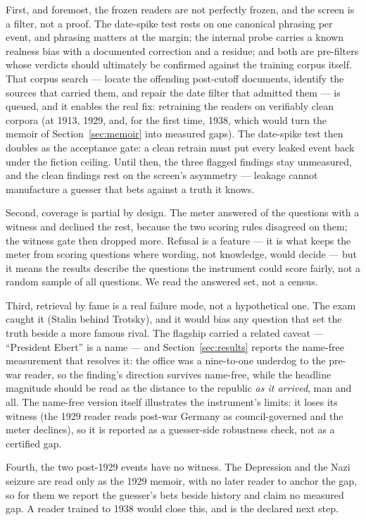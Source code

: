 \documentclass[11pt]{article}
\begin{document}
First, and foremost, the frozen readers are not perfectly frozen, and the screen is a filter, not a proof.
The date-spike test rests on one canonical phrasing per event, and phrasing matters at the margin; the
internal probe carries a known realness bias with a documented correction and a residue; and both are
pre-filters whose verdicts should ultimately be confirmed against the training corpus itself. That corpus
search --- locate the offending post-cutoff documents, identify the sources that carried them, and repair
the date filter that admitted them --- is queued, and it enables the real fix: retraining the readers on
verifiably clean corpora (at 1913, 1929, and, for the first time, 1938, which would turn the memoir of
Section~\ref{sec:memoir} into measured gaps). The date-spike test then doubles as the acceptance gate: a
clean retrain must put every leaked event back under the fiction ceiling. Until then, the three flagged
findings stay unmeasured, and the clean findings rest on the screen's asymmetry --- leakage cannot
manufacture a guesser that bets against a truth it knows.

Second, coverage is partial by design. The meter answered \NnCovered{} of the \NnMeasured{} questions with
a witness and declined the rest, because the two scoring rules disagreed on them; the witness gate then
dropped \NgateDropped{} more. Refusal is a feature --- it is what keeps the meter from scoring questions
where wording, not knowledge, would decide --- but it means the results describe the questions the
instrument could score fairly, not a random sample of all questions. We read the answered set, not a
census.

Third, retrieval by fame is a real failure mode, not a hypothetical one. The exam caught it (Stalin behind
Trotsky), and it would bias any question that set the truth beside a more famous rival. The flagship
carried a related caveat --- ``President Ebert'' is a name --- and Section~\ref{sec:results} reports the
name-free measurement that resolves it: the office was a nine-to-one underdog to the pre-war reader, so
the finding's direction survives name-free, while the headline magnitude should be read as the distance
to the republic \emph{as it arrived}, man and all. The name-free version itself illustrates the
instrument's limits: it loses its witness (the 1929 reader reads post-war Germany as council-governed and
the meter declines), so it is reported as a guesser-side robustness check, not as a certified gap.

Fourth, the two post-1929 events have no witness. The Depression and the Nazi seizure are read only as the
1929 memoir, with no later reader to anchor the gap, so for them we report the guesser's bets beside
history and claim no measured gap. A reader trained to 1938 would close this, and is the declared next
step.
\end{document}
